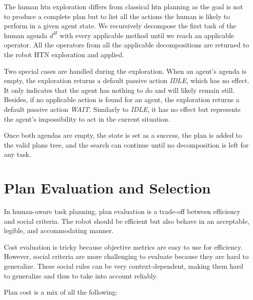 The human \acrshort{htn} exploration differs from classical \acrshort{htn} planning as the goal is not to produce a complete plan but to list all the actions the human is likely to perform in a given agent state. 
We recursively decompose the first task of the human agenda $d^H$ with every applicable method until we reach an applicable operator. All the operators from all the applicable decompositions are returned to the robot HTN exploration and applied.

Two special cases are handled during the exploration. 
When an agent's agenda is empty, the exploration returns a default passive action \textit{IDLE}, which has no effect. It only indicates that the agent has nothing to do and will likely remain still. 
Besides, if no applicable action is found for an agent, the exploration returns a default passive action \textit{WAIT}. Similarly to \textit{IDLE}, it has no effect but represents the agent's impossibility to act in the current situation. 

Once both agendas are empty, the state is set as a success, the plan is added to the valid plans tree, and the search can continue until no decomposition is left for any task.


\section{Plan Evaluation and Selection}

In human-aware task planning, plan evaluation is a trade-off between efficiency and social criteria.
The robot should be efficient but also behave in an acceptable, legible, and accommodating manner.  


Cost evaluation is tricky because objective metrics are easy to use for efficiency. However, social criteria are more challenging to evaluate because they are hard to generalize. These social rules can be very context-dependent, making them hard to generalize and thus to take into account reliably.

Plan cost is a mix of all the following:

